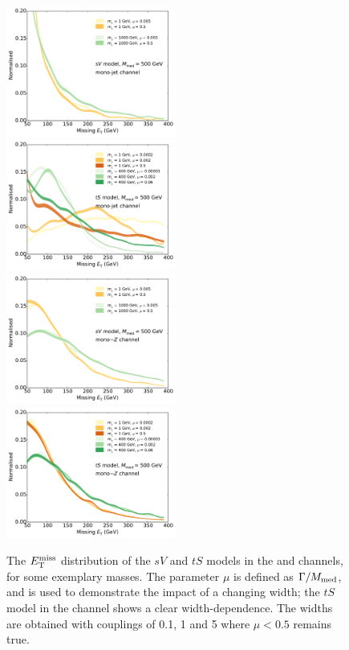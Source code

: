 \begin{figure}[t]
  \begin{center}
    \includegraphics[width=0.495\textwidth]{figures/MET_monojet_SVD.pdf}
    \includegraphics[width=0.495\textwidth]{figures/MET_monojet_TSD.pdf}
    \includegraphics[width=0.495\textwidth]{figures/MET_monoZ_SVD.pdf}
    \includegraphics[width=0.495\textwidth]{figures/MET_monoZ_TSD.pdf}
    \caption{The $E_{\mathrm{T}}^{\mathrm{miss}}$ distribution of the $sV$ and $tS$ models in the \monojet and \monoZ channels, for some exemplary masses. The parameter $\mu$ is defined as $\Gamma / M_{\mathrm{med}}$, and is used to demonstrate the impact of a changing width; the $tS$ model in the \monojet channel shows a clear width-dependence. The widths are obtained with couplings of 0.1, 1 and 5 where $\mu < 0.5$ remains true.}
    \label{fig:MET_dists}
  \end{center}
\end{figure}
